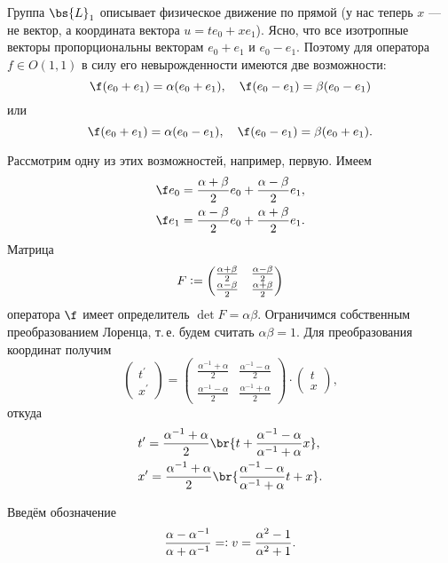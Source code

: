 Группа $\bs{L}_1$ описывает физическое движение по прямой (у нас теперь $x$ --- не вектор, а координата вектора $u = te_0 + xe_1$). Ясно, что все изотропные векторы пропорциональны векторам $e_0 + e_1$ и $e_0 - e_1$. Поэтому для оператора $f \in O(1, 1)$ в силу его невырожденности имеются две возможности:
\[
    \f(e_0 + e_1) = \alpha(e_0 + e_1),\quad\f(e_0 - e_1) = \beta(e_0 - e_1)
\]
или
\[
    \f(e_0 + e_1) = \alpha(e_0 - e_1),\quad\f(e_0 - e_1) = \beta(e_0 + e_1).
\]

Рассмотрим одну из этих возможностей, например, первую. Имеем
\begin{align*}
    &\f e_0 = \frac{\alpha + \beta}{2}e_0 + \frac{\alpha - \beta}{2}e_1,\\
    &\f e_1 = \frac{\alpha - \beta}{2}e_0 + \frac{\alpha + \beta}{2}e_1.
\end{align*}
Матрица
\[
    F \vcentcolon =
    \begin{pmatrix}
        \frac{\alpha + \beta}{2} & \frac{\alpha - \beta}{2}\\
        \frac{\alpha - \beta}{2} & \frac{\alpha + \beta}{2}
    \end{pmatrix}
\]
оператора $\f$ имеет определитель $\det F = \alpha\beta$. Ограничимся собственным преобразованием Лоренца, т.\,е. будем считать $\alpha\beta = 1$. Для преобразования координат получим
\[
    \begin{pmatrix}
        t^\prime\\
        x^\prime
    \end{pmatrix} =
    \begin{pmatrix}
        \frac{\alpha^{-1} + \alpha}{2} & \frac{\alpha^{-1} - \alpha}{2}\\
        \frac{\alpha^{-1} - \alpha}{2} & \frac{\alpha^{-1} + \alpha}{2}
    \end{pmatrix} \cdot 
    \begin{pmatrix}
        t\\
        x
    \end{pmatrix},
\]
откуда
\begin{align*}
    &t^\prime = \frac{\alpha^{-1} + \alpha}{2}\br{t + \frac{\alpha^{-1} - \alpha}{\alpha^{-1} + \alpha}x},\\
    &x^\prime = \frac{\alpha^{-1} + \alpha}{2}\br{\frac{\alpha^{-1} - \alpha}{\alpha^{-1} + \alpha}t + x}.
\end{align*}

Введём обозначение
\[
    \frac{\alpha - \alpha^{-1}}{\alpha + \alpha^{-1}} = \vcentcolon v = \frac{\alpha^2 - 1}{\alpha^2 + 1}.
\]

